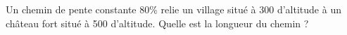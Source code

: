 
\begin{exercice}\label{exosmath-0620}

    Un chemin de pente constante \( 80\)\% relie un village situé à \unit{300}{\meter} d'altitude à un château fort situé à \unit{500}{\meter} d'altitude. Quelle est la longueur du chemin ?

\end{exercice}
